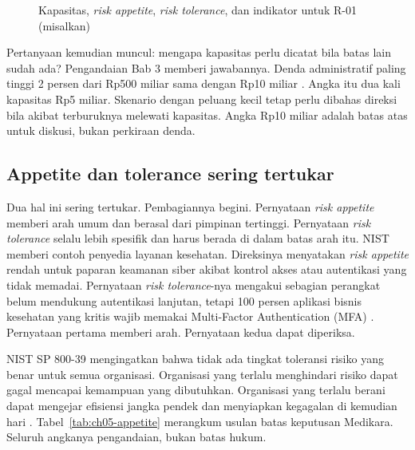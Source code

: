 \begin{figure}[!htb]
  \centering
  
  \caption{Kapasitas, \textit{risk appetite}, \textit{risk tolerance}, dan indikator untuk R-01
  (misalkan)}
  \label{fig:ch05-batas}
\end{figure}

Pertanyaan kemudian muncul: mengapa kapasitas perlu dicatat bila batas lain sudah ada? Pengandaian
Bab 3 memberi jawabannya. Denda administratif paling tinggi 2 persen dari Rp500 miliar sama dengan
Rp10 miliar \cite{uu27-2022-pdp}. Angka itu dua kali kapasitas Rp5 miliar. Skenario dengan peluang
kecil tetap perlu dibahas direksi bila akibat terburuknya melewati kapasitas. Angka Rp10 miliar
adalah batas atas untuk diskusi, bukan perkiraan denda.

\subsection*{Appetite dan tolerance sering tertukar}

Dua hal ini sering tertukar. Pembagiannya begini. Pernyataan \textit{risk appetite} memberi arah umum
dan berasal dari pimpinan tertinggi. Pernyataan \textit{risk tolerance} selalu lebih spesifik dan
harus berada di dalam batas arah itu. NIST memberi contoh penyedia layanan kesehatan. Direksinya
menyatakan \textit{risk appetite} rendah untuk paparan keamanan siber akibat kontrol akses atau
autentikasi yang tidak memadai. Pernyataan \textit{risk tolerance}-nya mengakui sebagian perangkat
belum mendukung autentikasi lanjutan, tetapi 100 persen aplikasi bisnis kesehatan yang kritis wajib
memakai Multi-Factor Authentication (MFA) \cite{c05-nist-ir8286ar1}. Pernyataan pertama memberi arah.
Pernyataan kedua dapat diperiksa.

NIST SP 800-39 mengingatkan bahwa tidak ada tingkat toleransi risiko yang benar untuk semua
organisasi. Organisasi yang terlalu menghindari risiko dapat gagal mencapai kemampuan yang dibutuhkan.
Organisasi yang terlalu berani dapat mengejar efisiensi jangka pendek dan menyiapkan kegagalan di
kemudian hari \cite{c05-nist-sp80039}. Tabel~\ref{tab:ch05-appetite} merangkum usulan batas keputusan
Medikara. Seluruh angkanya pengandaian, bukan batas hukum.

